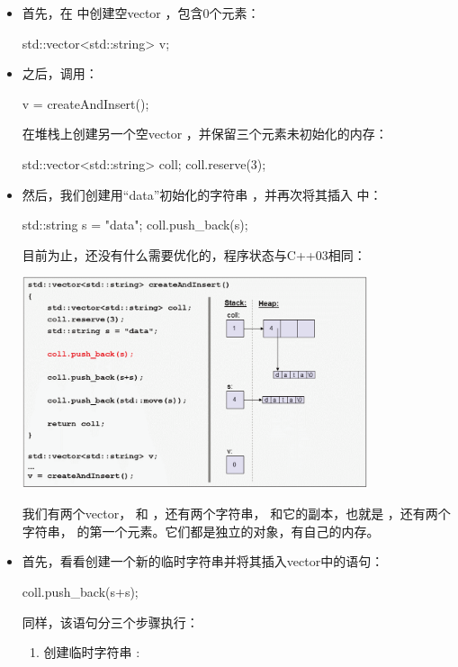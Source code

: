 \begin{itemize}
	\item 首先，在  中创建空vector ，包含0个元素：
	\begin{cppcode}
std::vector<std::string> v;
	\end{cppcode}
	\item 之后，调用：
\begin{cppcode}
v = createAndInsert();
\end{cppcode}
	在堆栈上创建另一个空vector ，并保留三个元素未初始化的内存：
\begin{cppcode}
std::vector<std::string> coll;
coll.reserve(3);
\end{cppcode}
	\item 然后，我们创建用“data”初始化的字符串 ，并再次将其插入  中：
\begin{cppcode}
std::string s = "data";
coll.push_back(s);
\end{cppcode}
	目前为止，还没有什么需要优化的，程序状态与C++03相同：
\begin{center}
		\includegraphics[width=0.8\textwidth]{part1/ch1/images/10}
	\end{center}
	我们有两个vector， 和 ，还有两个字符串， 和它的副本，也就是 ，还有两个字符串， 的第一个元素。它们都是独立的对象，有自己的内存。

	\item 首先，看看创建一个新的临时字符串并将其插入vector中的语句：
\begin{cppcode}
coll.push_back(s+s);
\end{cppcode}
	同样，该语句分三个步骤执行：

	\begin{enumerate}
		\item 创建临时字符串 :


\end{enumerate}
\end{itemize}
